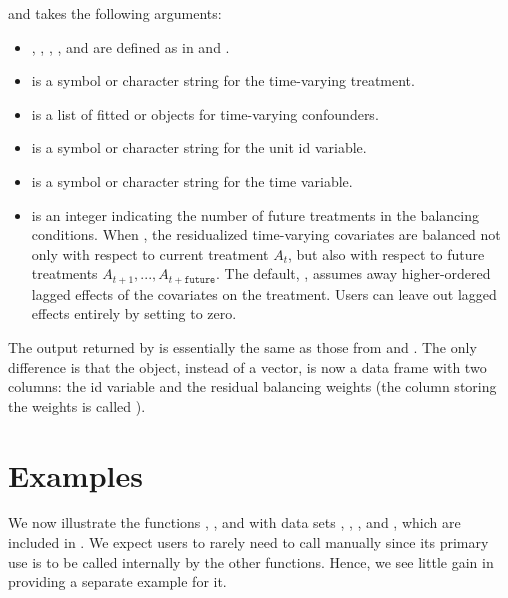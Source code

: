 and takes the following arguments:

\begin{itemize}
\tightlist
\item
  , , ,
  , and  are defined as in
   and .
\item
   is a symbol or character string for the time-varying
  treatment.
\item
   is a list of fitted  or  objects for
  time-varying confounders.
\item
   is a symbol or character string for the unit id variable.
\item
   is a symbol or character string for the time variable.
\item
   is an integer indicating the number of future treatments
  in the balancing conditions. When , the residualized
  time-varying covariates are balanced not only with respect to current
  treatment \(A_{t}\), but also with respect to future treatments
  \(A_{t+1},...,A_{t+\texttt{future}}\). The default, ,
  assumes away higher-ordered lagged effects of the covariates on the
  treatment. Users can leave out lagged effects entirely by setting
   to zero.
\end{itemize}

The output returned by  is essentially the same as
those from  and . The only difference is
that the  object, instead of a vector, is now a data frame
with two columns: the id variable and the residual balancing weights
(the column storing the weights is called ).

\hypertarget{examples}{%
\section{Examples}\label{examples}}

We now illustrate the functions , ,
and  with data sets , ,
, and , which are included in
. We expect users to rarely need to call 
manually since its primary use is to be called internally by the other
functions. Hence, we see little gain in providing a separate example for
it.

